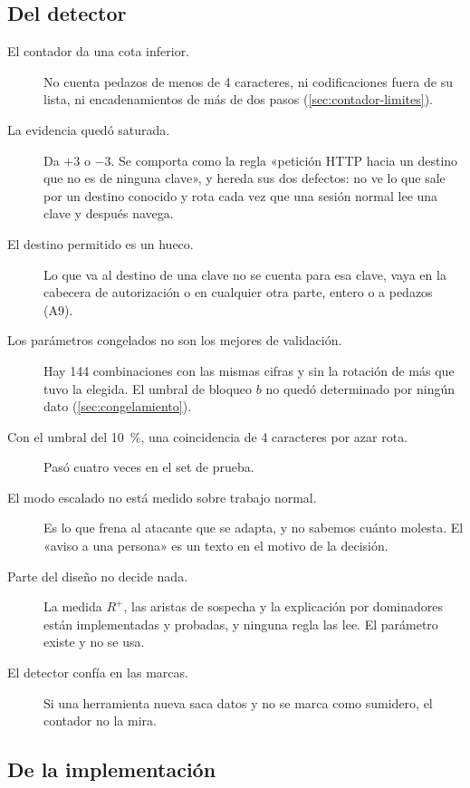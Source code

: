 \subsection{Del detector}

\begin{description}
  \item[El contador da una cota inferior.] No cuenta pedazos de menos de 4 caracteres, ni
    codificaciones fuera de su lista, ni encadenamientos de más de dos pasos (\cref{sec:contador-limites}).
  \item[La evidencia quedó saturada.] Da $+3$ o $-3$. Se comporta como la regla «petición HTTP hacia un
    destino que no es de ninguna clave», y hereda sus dos defectos: no ve lo que sale por un destino
    conocido y rota cada vez que una sesión normal lee una clave y después navega.
  \item[El destino permitido es un hueco.] Lo que va al destino de una clave no se cuenta para esa
    clave, vaya en la cabecera de autorización o en cualquier otra parte, entero o a pedazos (A9).
  \item[Los parámetros congelados no son los mejores de validación.] Hay 144 combinaciones con las
    mismas cifras y sin la rotación de más que tuvo la elegida. El umbral de bloqueo $b$ no quedó
    determinado por ningún dato (\cref{sec:congelamiento}).
  \item[Con el umbral del \qty{10}{\percent}, una coincidencia de 4 caracteres por azar rota.] Pasó
    cuatro veces en el set de prueba.
  \item[El modo escalado no está medido sobre trabajo normal.] Es lo que frena al atacante que se
    adapta, y no sabemos cuánto molesta. El «aviso a una persona» es un texto en el motivo de la
    decisión.
  \item[Parte del diseño no decide nada.] La medida $R^{+}$, las aristas de sospecha y la explicación
    por dominadores están implementadas y probadas, y ninguna regla las lee. El parámetro 
    existe y no se usa.
  \item[El detector confía en las marcas.] Si una herramienta nueva saca datos y no se marca como
    sumidero, el contador no la mira.
\end{description}

\subsection{De la implementación}

